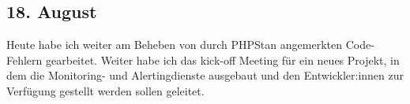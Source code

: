 \subsection{18. August}
Heute habe ich weiter am Beheben von durch PHPStan angemerkten Code-Fehlern gearbeitet. Weiter habe ich das kick-off Meeting für ein neues Projekt, in dem die Monitoring- und Alertingdienste ausgebaut und den Entwickler:innen zur Verfügung gestellt werden sollen geleitet. 
